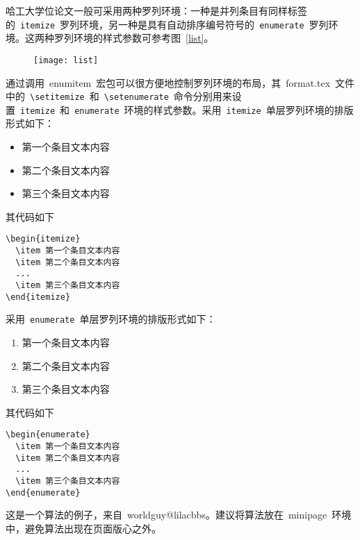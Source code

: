 哈工大学位论文一般可采用两种罗列环境：一种是并列条目有同样标签的~\verb|itemize|~罗列环境，另一种是具有自动排序编号符号的~\verb|enumerate|~罗列环境。这两种罗列环境的样式参数可参考图~\ref{list}。
\begin{figure}[htbp]
\centering
\texttt{[image: list]}
\vspace{-1em}
\end{figure}
通过调用~enumitem~宏包可以很方便地控制罗列环境的布局，其~format.tex~文件中的~\verb|\setitemize|~和~\verb|\setenumerate|~命令分别用来设置~\verb|itemize|~和~\verb|enumerate|~环境的样式参数。采用~\verb|itemize|~单层罗列环境的排版形式如下：
\begin{itemize}
\item 第一个条目文本内容
\item 第二个条目文本内容
\item 第三个条目文本内容
\end{itemize}
其代码如下
\begin{verbatim}
\begin{itemize}
  \item 第一个条目文本内容
  \item 第二个条目文本内容
  ...
  \item 第三个条目文本内容
\end{itemize}
\end{verbatim}
采用~\verb|enumerate|~单层罗列环境的排版形式如下：
\begin{enumerate}
\item 第一个条目文本内容
\item 第二个条目文本内容
\item 第三个条目文本内容
\end{enumerate}
其代码如下
\begin{verbatim}
\begin{enumerate}
  \item 第一个条目文本内容
  \item 第二个条目文本内容
  ...
  \item 第三个条目文本内容
\end{enumerate}
\end{verbatim}


这是一个算法的例子，来自~worldguy@lilacbbs。建议将算法放在~minipage~环境中，避免算法出现在页面版心之外。

